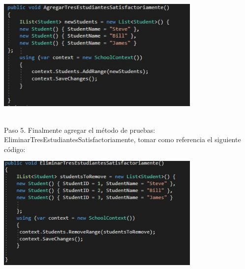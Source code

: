 \begin{center}
	\includegraphics[width=10cm]{./Imagenes/Captura11} 
	\end{center}

\textbf{}\\
Paso 5. Finalmente agregar el método de pruebas: EliminarTresEstudiantesSatisfactoriamente, tomar como
referencia el siguiente código:

\begin{center}
	\includegraphics[width=10cm]{./Imagenes/Captura12} 
	\end{center}
\textbf{}\\



